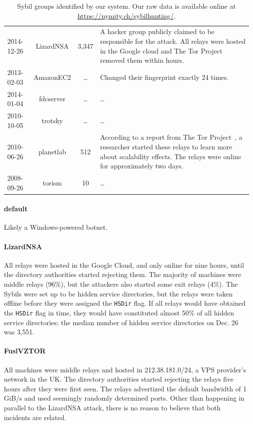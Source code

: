 \begin{table}[t]
\begin{tabular}{l c c p{10cm}}
2014-12-26 & LizardNSA & 3,347 & A hacker group publicly claimed to be
responsible for the attack.  All relays were hosted in the Google cloud and The
Tor Project removed them within hours. \\
2013-02-03 & AmazonEC2 & \ldots & Changed their fingerprint exactly 24 times. \\
2014-01-04 & fdcserver & \ldots & \ldots \\
2010-10-05 & trotsky & \ldots & \ldots \\
2010-06-26 & planetlab & 512 & According to a report from The Tor
Project~\cite{progressreport}, a researcher started these relays to learn more
about scalability effects.  The relays were online for approximately two days. \\
2008-09-26 & torism & 10 & \ldots \\
\end{tabular}
\caption{Sybil groups identified by our system.  Our raw data is available
online at {\normalfont\url{https://nymity.ch/sybilhunting/}}.}
\label{tab:sybils}
\end{table}

\paragraph{default}
Likely a Windows-powered botnet.

\paragraph{LizardNSA}
All relays were hosted in the Google Cloud, and only online for nine hours,
until the directory authorities started rejecting them.  The majority of
machines were middle relays (96\%), but the attackers also started some exit
relays (4\%).  The Sybils were set up to be hidden service directories, but the
relays were taken offline before they were assigned the \texttt{HSDir} flag.  If
all relays would have obtained the \texttt{HSDir} flag in time, they would have
constituted almost 50\% of all hidden service directories; the median number of
hidden service directories on Dec. 26 was 3,551.

\paragraph{FuslVZTOR}
All machines were middle relays and hosted in 212.38.181.0/24, a VPS provider's
network in the UK.  The directory authorities started rejecting the relays five
hours after they were first seen.  The relays advertized the default bandwidth
of 1 GiB/s and used seemingly randomly determined ports.  Other than happening
in parallel to the LizardNSA attack, there is no reason to believe that both
incidents are related.


